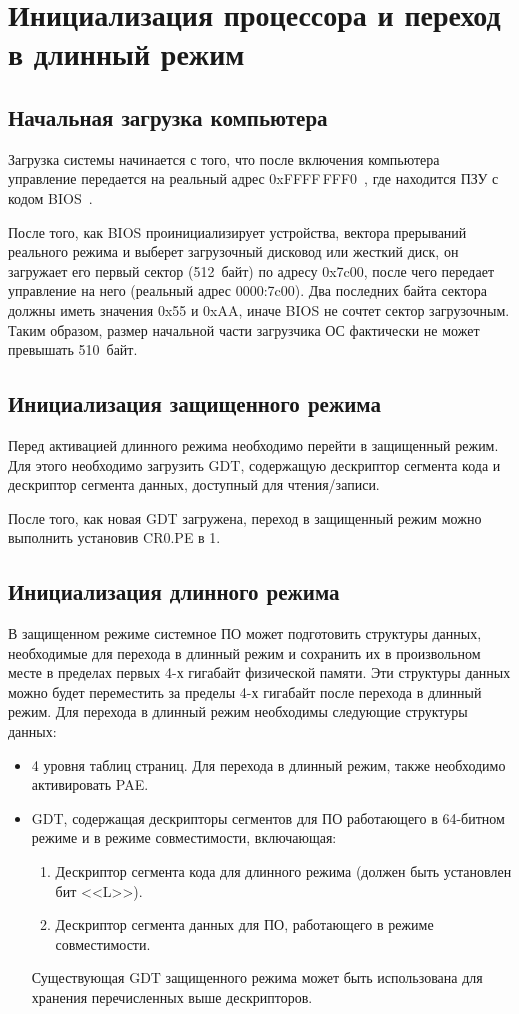 \section{Инициализация процессора и переход в длинный режим}
\label{sec:long_mode_activation}

\subsection{Начальная загрузка компьютера}
Загрузка системы начинается с того, что после включения компьютера
управление передается на реальный адрес 0xFFFF\,FFF0~\cite{amd_pm_v2}, где находится
ПЗУ с кодом BIOS~\cite{mstu_os_dev_method}.

После того, как BIOS проинициализирует устройства, вектора прерываний реального
режима и выберет загрузочный дисковод или жесткий диск, он загружает его
первый сектор (512~байт) по адресу 0x7c00, после чего передает управление на
него (реальный адрес 0000:7c00). Два последних байта сектора должны иметь
значения 0x55 и 0xAA, иначе BIOS не сочтет сектор загрузочным. Таким образом,
размер начальной части загрузчика ОС фактически не может превышать 510~байт.

\subsection{Инициализация защищенного режима}
Перед активацией длинного режима необходимо перейти в защищенный режим.
Для этого необходимо загрузить GDT, содержащую дескриптор сегмента кода и
дескриптор сегмента данных, доступный для чтения/записи.

После того, как новая GDT загружена, переход в защищенный режим можно выполнить установив CR0.PE в 1.

\subsection{Инициализация длинного режима}
В защищенном режиме системное ПО может подготовить структуры данных, необходимые для перехода в
длинный режим и сохранить их в произвольном месте в пределах первых 4-х гигабайт физической памяти.
Эти структуры данных можно будет переместить за пределы 4-х гигабайт после перехода в длинный режим.
Для перехода в длинный режим необходимы следующие структуры данных:
\begin{itemize}
\item 4 уровня таблиц страниц. Для перехода в длинный режим, также необходимо активировать PAE.
\item GDT, содержащая дескрипторы сегментов для ПО работающего в 64-битном режиме и в
	режиме совместимости, включающая:
	\begin{enumerate}[1.]
	\item Дескриптор сегмента кода для длинного режима (должен быть установлен бит <<L>>).
	\item Дескриптор сегмента данных для ПО, работающего в режиме совместимости.
	\end{enumerate}

	Существующая GDT защищенного режима может быть использована для хранения перечисленных
	выше дескрипторов.
\end{itemize}

